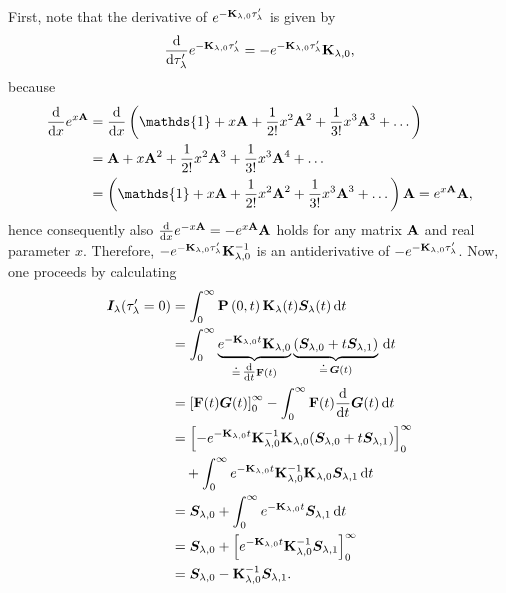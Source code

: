 \documentclass[a4paper,12pt]{report}
\begin{document}
First, note that the derivative of $e^{-\boldsymbol{\mathbf{K}}_{\lambda,0}\tau_\lambda^\prime}$ is given by \begin{equation}
\frac{\mathrm{d}}{\mathrm{d}\tau_\lambda^\prime}e^{-\boldsymbol{\mathbf{K}}_{\lambda,0}\tau_\lambda^\prime} = -e^{-\boldsymbol{\mathbf{K}}_{\lambda,0}\tau_\lambda^\prime}\boldsymbol{\mathbf{K}}_{\lambda,0},
\end{equation} because \begin{align}
\begin{aligned}
\frac{\mathrm{d}}{\mathrm{d}x}e^{x\matr{A}} &= \frac{\mathrm{d}}{\mathrm{d}x}\left(\mathds{1} + x\matr{A} + \frac{1}{2!}x^2\matr{A}^2 + \frac{1}{3!}x^3\matr{A}^3 + \dots \right) \\
&= \matr{A} + x\matr{A}^2 + \frac{1}{2!}x^2\matr{A}^3 +  \frac{1}{3!}x^3\matr{A}^4 + \dots \\
&= \left(\mathds{1} + x\matr{A} + \frac{1}{2!}x^2\matr{A}^2 +  \frac{1}{3!}x^3\matr{A}^3 + \dots\right)\matr{A} = e^{x\matr{A}}\matr{A},
\end{aligned}
\end{align} hence consequently also $\frac{\mathrm{d}}{\mathrm{d}x}e^{-x\boldsymbol{\mathbf{A}}} = -e^{x\boldsymbol{\mathbf{A}}}\boldsymbol{\mathbf{A}}$ holds for any matrix $\boldsymbol{\mathbf{A}}$ and real parameter $x$. Therefore, $-e^{-\boldsymbol{\mathbf{K}}_{\lambda,0}\tau_\lambda^\prime}\boldsymbol{\mathbf{K}}_{\lambda,0}^{-1}$ is an antiderivative of $-e^{-\boldsymbol{\mathbf{K}}_{\lambda,0}\tau_\lambda^\prime}$. Now, one proceeds by calculating \begin{align}
\begin{aligned}\label{eq:fundamentalMEsolution}
\vect{I}_\lambda(\tau_\lambda^\prime = 0) &= \int_{0}^{ \infty}\matr{P}\left(0,t\right)\matr{K}_\lambda(t)\vect{S}_\lambda(t)\,\mathrm{d}t \\ &= \int_{0}^{\infty}\underbrace{e^{-\matr{K}_{\lambda,0}t}\matr{K}_{\lambda,0}}_{\doteq\,\tfrac{\mathrm{d}}{\mathrm{d}t}\matr{F}(t)}\underbrace{\left(\vect{S}_{\lambda,0}+t\vect{S}_{\lambda,1}\right)}_{\doteq\,\vect{G}(t)}\,\mathrm{d}t \\
&= \left[\matr{F}(t)\vect{G}(t)\right]^{\infty}_{0} - \int_{0}^{\infty} \matr{F}(t)\frac{\mathrm{d}}{\mathrm{d}t}\vect{G}(t)\,\mathrm{d}t \\
&= \left[-e^{-\matr{K}_{\lambda,0}t}\matr{K}_{\lambda,0}^{-1}\matr{K}_{\lambda,0}(\vect{S}_{\lambda,0}+t\vect{S}_{\lambda,1})\right]^{\infty}_{0} \\ &\quad + \int_{0}^{\infty}e^{-\matr{K}_{\lambda,0}t}\matr{K}_{\lambda,0}^{-1}\matr{K}_{\lambda,0}\vect{S}_{\lambda,1}\,\mathrm{d}t \\
&= \vect{S}_{\lambda,0} + \int_{0}^{\infty}e^{-\matr{K}_{\lambda,0}t}\vect{S}_{\lambda,1}\,\mathrm{d}t \\ &= \vect{S}_{\lambda,0} + \left[e^{-\matr{K}_{\lambda,0}t}\matr{K}_{\lambda,0}^{-1}\vect{S}_{\lambda,1}\right]^{\infty}_0 \\ &= \vect{S}_{\lambda,0}-\matr{K}_{\lambda,0}^{-1}\vect{S}_{\lambda,1}.

\end{aligned}
\end{align}
\end{document}
